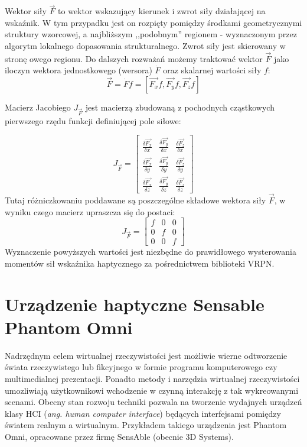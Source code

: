 \documentclass[licencjacka]{pracamgr}
\begin{document}
Wektor siły $\vec{F}$ to wektor wskazujący kierunek i zwrot siły działającej na wskaźnik. W tym przypadku jest on rozpięty pomiędzy środkami geometrycznymi struktury wzorcowej, a najbliższym ,,podobnym'' regionem - wyznaczonym przez algorytm lokalnego dopasowania strukturalnego. Zwrot siły jest skierowany w stronę owego regionu. Do dalszych rozważań możemy traktować wektor $\vec{F}$ jako iloczyn wektora jednostkowego (wersora) $\dot{F}$ oraz skalarnej wartości siły $f$:
$$
\vec{F}=\dot{F}f=[\vec{F_x}f,\vec{F_y}f,\vec{F_z}f]
$$

Macierz Jacobiego $J_{\vec{F}}$ jest macierzą zbudowaną z pochodnych cząstkowych pierwszego rzędu funkcji definiującej pole siłowe:

$$
J_{\vec{F}}=
\begin{bmatrix}
\frac{\delta \vec{F_x}}{\delta x} & \frac{\delta \vec{F_y}}{\delta x} & \frac{\delta \vec{F_z}}{\delta x} \\
\frac{\delta \vec{F_x}}{\delta y} & \frac{\delta \vec{F_y}}{\delta y} & \frac{\delta \vec{F_z}}{\delta y} \\
\frac{\delta \vec{F_x}}{\delta z} & \frac{\delta \vec{F_y}}{\delta z} & \frac{\delta \vec{F_z}}{\delta z}
\end{bmatrix}
$$
Tutaj różniczkowaniu poddawane są poszczególne składowe wektora siły $\vec{F}$, w wyniku czego macierz upraszcza się do postaci:
$$
J_{\vec{F}}=
\begin{bmatrix}
f & 0 & 0 \\
0 & f & 0 \\
0 & 0 & f
\end{bmatrix}
$$
Wyznaczenie powyższych wartości jest niezbędne do prawidłowego wysterowania momentów sił wskaźnika haptycznego za pośrednictwem biblioteki VRPN.

\chapter{Urządzenie haptyczne Sensable Phantom Omni}
Nadrzędnym celem wirtualnej rzeczywistości jest możliwie wierne odtworzenie świata rzeczywistego lub fikcyjnego w formie programu komputerowego czy multimedialnej prezentacji. Ponadto metody i narzędzia wirtualnej rzeczywistości umozliwiają użytkownikowi wchodzenie w czynną interakcję z tak wykreowanymi scenami. Obecny stan rozwoju techniki pozwala na tworzenie wydajnych urządzeń klasy HCI (\textit{ang. human computer interface}) będących interfejsami pomiędzy światem realnym a wirtualnym. Przykładem takiego urządzenia jest Phantom Omni, opracowane przez firmę SensAble (obecnie 3D Systems). 
\end{document}
